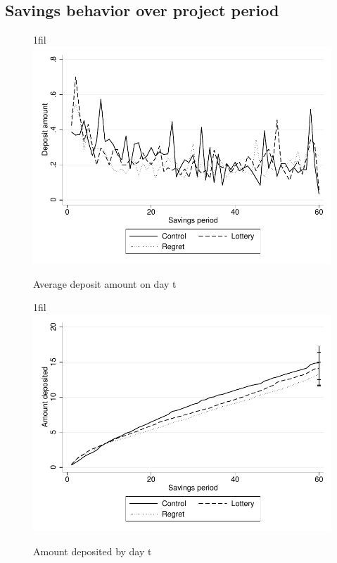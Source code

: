 \documentclass[10pt]{article}
\makeatletter
\newcommand*{\centerfloat}{%
  \parindent \z@
  \leftskip \z@ \@plus 1fil \@minus \textwidth
  \rightskip\leftskip
  \parfillskip \z@skip}
\makeatother
\begin{document}
	\clearpage

	\subsection{Savings behavior over project period}

		\begin{figure}[!htb]
		\centering
		\caption{Average deposit amount on day t}
		\centerfloat
		\includegraphics{../../figures/line-depositamount.pdf}
		\end{figure}

		\begin{figure}[!htb]
		\centering
		\caption{Amount deposited by day t}
		\centerfloat
		\includegraphics{../../figures/line-cumdepositamount.pdf}
		\end{figure}
\end{document}
